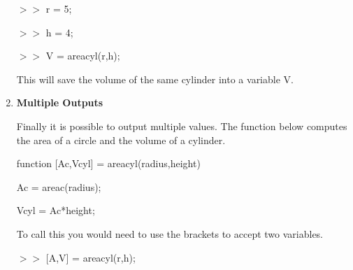 \begin{enumerate}
$>>$ r = 5;

$>>$ h = 4;

$>>$ V = areacyl(r,h);

This will save the volume of the same cylinder into a variable V. 

\item {\bf Multiple Outputs}

Finally it is possible to output multiple values. The function below
computes the area of a circle and the volume of a cylinder.

\begin{framed}

function [Ac,Vcyl] = areacyl(radius,height)

Ac = areac(radius);

Vcyl = Ac*height;

\end{framed}

To call this you would need to use the brackets to accept two
variables.

$>>$ [A,V] = areacyl(r,h);

\end{enumerate}

